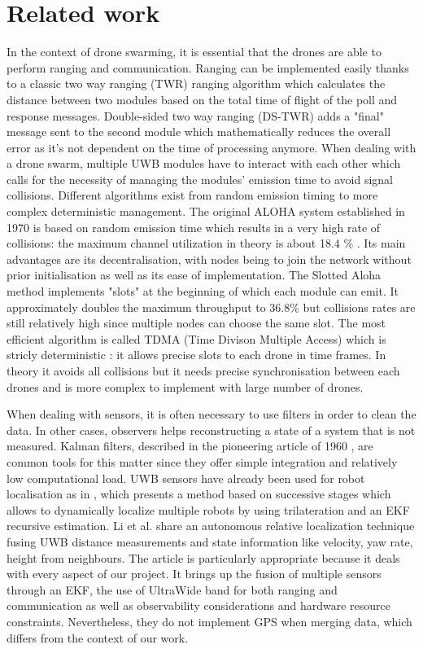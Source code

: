 \documentclass[conference]{IEEEtran}
\begin{document}
\section{Related work}

In the context of drone swarming, it is essential that the drones are able to perform ranging and communication. Ranging can be implemented easily thanks to a classic two way ranging (TWR) ranging algorithm which calculates the distance between two modules based on the total time of flight of the poll and response messages. Double-sided two way ranging (DS-TWR) adds a "final" message sent to the second module which mathematically reduces the overall error as it's not dependent on the time of processing anymore. When dealing with a drone swarm, multiple UWB modules have to interact with each other which calls for the necessity of managing the modules' emission time to avoid signal collisions. 
Different algorithms exist from random emission timing to more complex deterministic management. The original ALOHA system established in 1970 is based on random emission time which results in a very high rate of collisions: the maximum channel utilization in theory is about 18.4 \% \parencite{noauthor_pdf_nodate}. Its main advantages are its decentralisation, with nodes being to join the network without prior initialisation as well as its ease of implementation. The Slotted Aloha method implements "slots" at the beginning of which each module can emit. It approximately doubles the maximum throughput to 36.8\% \parencite{noauthor_pdf_2026} but collisions rates are still relatively high since multiple nodes can choose the same slot. The most efficient algorithm is called TDMA (Time Divison Multiple Access) which is stricly deterministic : it allows precise slots to each drone in time frames. In theory it avoids all collisions but it needs precise synchronisation between each drones and is more complex to implement with large number of drones. 

When dealing with sensors, it is often necessary to use filters in order to clean the data. In other cases, observers helps reconstructing a state of a system that is not measured. Kalman filters, described in the pioneering article of 1960 \parencite{kalman1960}, are common tools for this matter since they offer simple integration and relatively low computational load. UWB sensors have already been used for robot localisation as in \parencite{cao_2018}, which presents a method based on successive stages which allows to dynamically localize multiple robots by using trilateration and an EKF recursive estimation.  Li et al. \parencite{li_2025} share an autonomous relative localization technique
fusing UWB distance measurements and state information like velocity, yaw rate, height from
neighbours. The article is particularly appropriate because it deals with every aspect of our project. It brings up the fusion of multiple sensors through an EKF, the use of UltraWide band for both ranging and communication as well as observability considerations and hardware resource constraints. Nevertheless, they do not implement GPS when merging data, which differs from the context of
our work.
\end{document}

